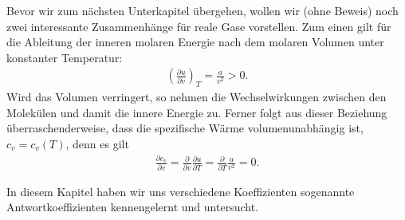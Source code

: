 Bevor wir zum nächsten Unterkapitel übergehen, wollen wir (ohne Beweis) noch zwei interessante Zusammenhänge für reale Gase vorstellen.
Zum einen gilt für die Ableitung der inneren molaren Energie nach dem molaren Volumen unter konstanter Temperatur: 
\begin{align*}
    \left( \frac{\partial u}{\partial v} \right)_T =\frac{a}{v^2}>0.
\end{align*}
Wird das Volumen verringert, so nehmen die Wechselwirkungen zwischen den Molekülen und damit die innere Energie zu.
Ferner folgt aus dieser Beziehung überraschenderweise, dass die spezifische Wärme volumenunabhängig ist, $c_v=c_v(T)$, denn es gilt
\begin{align*}
    \frac{\partial c_v}{\partial v}=\frac{\partial}{\partial v}\frac{\partial u}{\partial T}=\frac{\partial}{\partial T}\frac{a}{v^2}=0.
\end{align*} 

\begin{summary}
    In diesem Kapitel haben wir uns verschiedene Koeffizienten \textendash{} sogenannte Antwortkoeffizienten kennengelernt und untersucht. 


\end{summary}